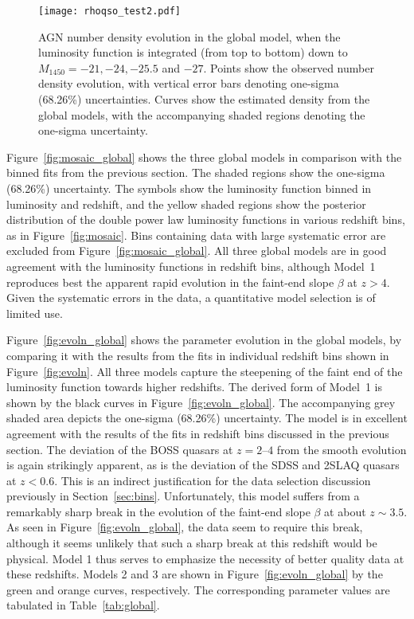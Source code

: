 \documentclass[fleqn,usenatbib]{mnras}
\newcommand{\new}[1]{{\color{notecolor} #1}}
\begin{document}
\begin{figure}
  \begin{center}
    \texttt{[image: rhoqso\_test2.pdf]}
  \end{center}
  \caption{\new{AGN number density evolution in the global model, when
      the luminosity function is integrated (from top to bottom) down
      to $M_\mathrm{1450}=-21, -24, -25.5$ and $-27$.  Points show the
      observed number density evolution, with vertical error bars
      denoting one-sigma (68.26\%) uncertainties.}  Curves show the
    estimated density from the global models, with the accompanying
    shaded regions denoting the one-sigma uncertainty. }
  \label{fig:rhoqso}
\end{figure}

Figure~\ref{fig:mosaic_global} shows the three global models in
comparison with the binned fits from the previous section.  The shaded
regions show the one-sigma (68.26\%) uncertainty.  The symbols show
the luminosity function binned in luminosity and redshift, and the
yellow shaded regions show the posterior distribution of the double
power law luminosity functions in various redshift bins, as in
Figure~\ref{fig:mosaic}.  Bins containing data with large systematic
error are excluded from Figure~\ref{fig:mosaic_global}.  \new{All
  three global models are in good agreement with the luminosity
  functions in redshift bins, although Model~1 reproduces best the
  apparent rapid evolution in the faint-end slope $\beta$ at $z>4$.
  Given the systematic errors in the data, a quantitative model
  selection is of limited use.}

Figure~\ref{fig:evoln_global} shows the parameter evolution in the
global models, by comparing it with the results from the fits in
individual redshift bins shown in Figure~\ref{fig:evoln}.  All three
models capture the steepening of the faint end of the luminosity
function towards higher redshifts.  The derived form of Model~1 is
shown by the black curves in Figure~\ref{fig:evoln_global}.  The
accompanying grey shaded area depicts the one-sigma (68.26\%)
uncertainty.  The model is in excellent agreement with the results of
the fits in redshift bins discussed in the previous section.
The deviation of the BOSS quasars at $z=2$--$4$ from the smooth
evolution is again strikingly apparent, as is the deviation of the
SDSS and 2SLAQ quasars at $z<0.6$.  This is an indirect justification
for the data selection discussion previously in
Section~\ref{sec:bins}.  Unfortunately, this model suffers from a
remarkably sharp break in the evolution of the faint-end slope $\beta$
at about $z\sim 3.5$.  As seen in Figure~\ref{fig:evoln_global}, the
data seem to require this break, although it seems unlikely that such
a sharp break at this redshift would be physical.  Model 1 thus serves
to emphasize the necessity of better quality data at these redshifts.
Models 2 and 3 are shown in Figure~\ref{fig:evoln_global} by the green
and orange curves, respectively.  The corresponding parameter values
are tabulated in Table~\ref{tab:global}.
\end{document}
